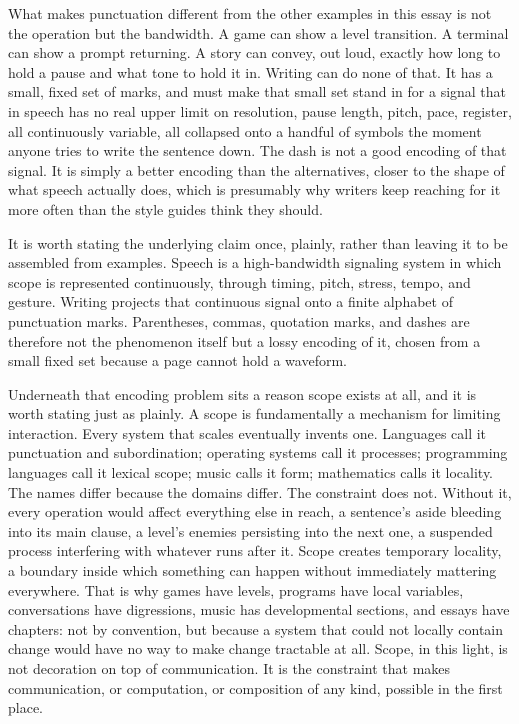\documentclass[11pt]{article}
\begin{document}
What makes punctuation different from the other examples in this essay is not the operation but the bandwidth. A game can show a level transition. A terminal can show a prompt returning. A story can convey, out loud, exactly how long to hold a pause and what tone to hold it in. Writing can do none of that. It has a small, fixed set of marks, and must make that small set stand in for a signal that in speech has no real upper limit on resolution, pause length, pitch, pace, register, all continuously variable, all collapsed onto a handful of symbols the moment anyone tries to write the sentence down. The dash is not a good encoding of that signal. It is simply a better encoding than the alternatives, closer to the shape of what speech actually does, which is presumably why writers keep reaching for it more often than the style guides think they should.

It is worth stating the underlying claim once, plainly, rather than leaving it to be assembled from examples. Speech is a high-bandwidth signaling system in which scope is represented continuously, through timing, pitch, stress, tempo, and gesture. Writing projects that continuous signal onto a finite alphabet of punctuation marks. Parentheses, commas, quotation marks, and dashes are therefore not the phenomenon itself but a lossy encoding of it, chosen from a small fixed set because a page cannot hold a waveform.

Underneath that encoding problem sits a reason scope exists at all, and it is worth stating just as plainly. A scope is fundamentally a mechanism for limiting interaction. Every system that scales eventually invents one. Languages call it punctuation and subordination; operating systems call it processes; programming languages call it lexical scope; music calls it form; mathematics calls it locality. The names differ because the domains differ. The constraint does not. Without it, every operation would affect everything else in reach, a sentence's aside bleeding into its main clause, a level's enemies persisting into the next one, a suspended process interfering with whatever runs after it. Scope creates temporary locality, a boundary inside which something can happen without immediately mattering everywhere. That is why games have levels, programs have local variables, conversations have digressions, music has developmental sections, and essays have chapters: not by convention, but because a system that could not locally contain change would have no way to make change tractable at all. Scope, in this light, is not decoration on top of communication. It is the constraint that makes communication, or computation, or composition of any kind, possible in the first place.
\end{document}

